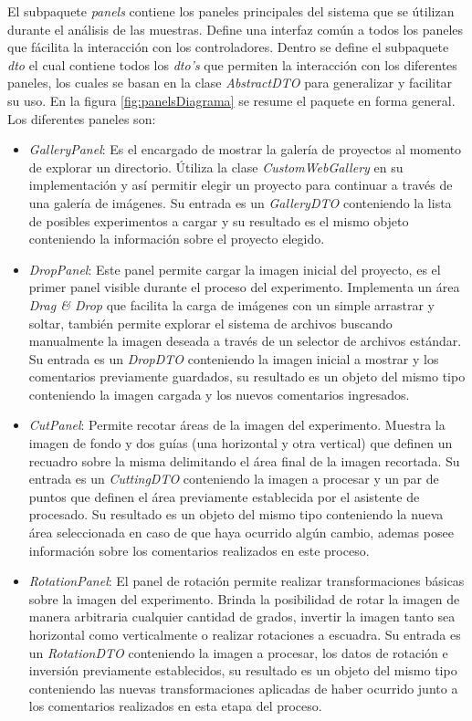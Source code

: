 El subpaquete \textit{panels} contiene los paneles principales del sistema que se \'utilizan durante el an\'alisis de las muestras. Define una interfaz com\'un a todos los paneles que f\'acilita la interacci\'on con los controladores. Dentro se define el subpaquete \textit{dto} el cual contiene todos los \textit{dto's} que permiten la interacci\'on con los diferentes paneles, los cuales se basan en la clase \textit{AbstractDTO} para generalizar y facilitar su uso. En la figura \ref{fig:panelsDiagrama} se resume el paquete en forma general. Los diferentes paneles son:
\begin{itemize}
	\item \textit{GalleryPanel}: Es el encargado de mostrar la galer\'ia de proyectos al momento de explorar un directorio. \'Utiliza la clase \textit{CustomWebGallery} en su implementaci\'on y as\'i permitir elegir un proyecto para continuar a trav\'es de una galer\'ia de im\'agenes. Su entrada es un \textit{GalleryDTO} conteniendo la lista de posibles experimentos a cargar y su resultado es el mismo objeto conteniendo la informaci\'on sobre el proyecto elegido.
	\item \textit{DropPanel}: Este panel permite cargar la imagen inicial del proyecto, es el primer panel visible durante el proceso del experimento. Implementa un \'area \textit{Drag \& Drop} que facilita la carga de im\'agenes con un simple arrastrar y soltar, tambi\'en permite explorar el sistema de archivos buscando manualmente la imagen deseada a trav\'es de un selector de archivos est\'andar. Su entrada es un \textit{DropDTO} conteniendo la imagen inicial a mostrar y los comentarios previamente guardados, su resultado es un objeto del mismo tipo conteniendo la imagen cargada y los nuevos comentarios ingresados.
	\item \textit{CutPanel}: Permite recotar \'areas de la imagen del experimento. Muestra la imagen de fondo y dos gu\'ias (una horizontal y otra vertical) que definen un recuadro sobre la misma delimitando el \'area final de la imagen recortada. Su entrada es un \textit{CuttingDTO} conteniendo la imagen a procesar y un par de puntos que definen el \'area previamente establecida por el asistente de procesado. Su resultado es un objeto del mismo tipo conteniendo la nueva \'area seleccionada en caso de que haya ocurrido alg\'un cambio, ademas posee informaci\'on sobre los comentarios realizados en este proceso.
	\item \textit{RotationPanel}: El panel de rotaci\'on permite realizar transformaciones b\'asicas sobre la imagen del experimento. Brinda la posibilidad de rotar la imagen de manera arbitraria cualquier cantidad de grados, invertir la imagen tanto sea horizontal como verticalmente o realizar rotaciones a escuadra. Su entrada es un \textit{RotationDTO} conteniendo la imagen a procesar, los datos de rotaci\'on e inversi\'on previamente establecidos, su resultado es un objeto del mismo tipo conteniendo las nuevas transformaciones aplicadas de haber ocurrido junto a los comentarios realizados en esta etapa del proceso.

\end{itemize}
